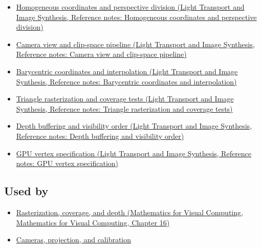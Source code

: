 \begin{itemize}
\tightlist
\item
  \href{../04-Light-Transport-and-Image-Synthesis/main.pdf\#nameddest=appendix-cb3b26862282}{Homogeneous coordinates and perspective division (Light Transport and Image Synthesis, Reference notes: Homogeneous coordinates and perspective division)}
\item
  \href{../04-Light-Transport-and-Image-Synthesis/main.pdf\#nameddest=appendix-1c07d64f5e70}{Camera view and clip-space pipeline (Light Transport and Image Synthesis, Reference notes: Camera view and clip-space pipeline)}
\item
  \href{../04-Light-Transport-and-Image-Synthesis/main.pdf\#nameddest=appendix-02b9d9a81dca}{Barycentric coordinates and interpolation (Light Transport and Image Synthesis, Reference notes: Barycentric coordinates and interpolation)}
\item
  \href{../04-Light-Transport-and-Image-Synthesis/main.pdf\#nameddest=appendix-ed3f9bc298fe}{Triangle rasterization and coverage tests (Light Transport and Image Synthesis, Reference notes: Triangle rasterization and coverage tests)}
\item
  \href{../04-Light-Transport-and-Image-Synthesis/main.pdf\#nameddest=appendix-97578ed97952}{Depth buffering and visibility order (Light Transport and Image Synthesis, Reference notes: Depth buffering and visibility order)}
\item
  \href{../04-Light-Transport-and-Image-Synthesis/main.pdf\#nameddest=appendix-749ba51a6c25}{GPU vertex specification (Light Transport and Image Synthesis, Reference notes: GPU vertex specification)}
\end{itemize}

\subsection{Used by}\label{appendix-40426e4b2103-used-by}

\begin{itemize}
\tightlist
\item
  \href{../02-Mathematics-for-Visual-Computing/main.pdf\#nameddest=03-visual-computing-i-ch012-rasterization-coverage-and-depth}{Rasterization, coverage, and depth (Mathematics for Visual Computing, Mathematics for Visual Computing, Chapter 16)}
\item
  \hyperref[03-visual-computing-i-ch003-cameras-projection-and-calibration]{Cameras, projection, and calibration}
\end{itemize}

